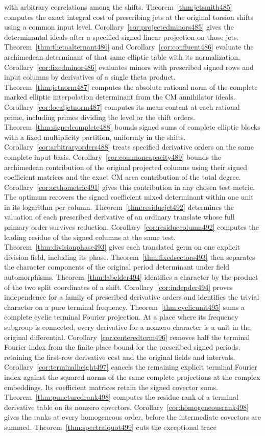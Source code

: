 \documentclass[a4paper,11pt]{article}
\theoremstyle{definition}
\theoremstyle{remark}
\numberwithin{equation}{section}
\begin{document}
with arbitrary correlations among the shifts. Theorem~\ref{thm:jetsmith485} computes the exact integral cost of prescribing jets at the original torsion shifts using a common input level. Corollary~\ref{cor:projectedminors485} gives the determinantal ideals after a specified signed linear projection on those jets. Theorem~\ref{thm:thetaalternant486} and Corollary~\ref{cor:confluent486} evaluate the archimedean determinant of that same elliptic table with its normalization. Corollary~\ref{cor:fixedminor486} evaluates minors with prescribed signed rows and input columns by derivatives of a single theta product. Theorem~\ref{thm:jetnorm487} computes the absolute rational norm of the complete marked elliptic interpolation determinant from the CM annihilator ideals. Corollary~\ref{cor:localjetnorm487} computes its mean content at each rational prime, including primes dividing the level or the shift orders. Theorem~\ref{thm:signedcomplete488} bounds signed sums of complete elliptic blocks with a fixed multiplicity partition, uniformly in the shifts. Corollary~\ref{cor:arbitraryorders488} treats specified derivative orders on the same complete input basis. Corollary~\ref{cor:commoncapacity489} bounds the archimedean contribution of the original projected columns using their signed coefficient matrices and the exact CM area contribution of the total degree. Corollary~\ref{cor:orthometric491} gives this contribution in any chosen test metric. The optimum recovers the signed coefficient mixed determinant within one unit in its logarithm per column. Theorem~\ref{thm:residuejet492} determines the valuation of each prescribed derivative of an ordinary translate whose full primary order survives reduction. Corollary~\ref{cor:residuecolumn492} computes the leading residue of the signed columns at the same test. Theorem~\ref{thm:divisionphase493} gives each translated germ on one explicit division field, including its phase. Theorem~\ref{thm:fixedsectors493} then separates the character components of the original period determinant under field automorphisms. Theorem~\ref{thm:labelder494} identifies a character by the product of the two split coordinates of a shift. Corollary~\ref{cor:indepder494} proves independence for a family of prescribed derivative orders and identifies the trivial character on a pure terminal frequency. Theorem~\ref{thm:cyclicunit495} sums a complete cyclic terminal Fourier projection. At a place where its frequency subgroup is connected, every derivative for a nonzero character is a unit in the original differential. Corollary~\ref{cor:centeredterm496} removes half the terminal Fourier index from the finite-place bound for the prescribed signed periods, retaining the first-row derivative cost and the original fields and intervals. Corollary~\ref{cor:terminalheight497} cancels the remaining explicit terminal Fourier index against the squared norms of the same complete projections at the complex embeddings. Its coefficient matrices retain the signed covector sums. Theorem~\ref{thm:puncturedrank498} computes the residue rank of a terminal derivative table on its nonzero covectors. Corollary~\ref{cor:homogeneousrank498} gives the ranks at every homogeneous order, before the intermediate covectors are summed. Theorem~\ref{thm:spectralquot499} cuts the exceptional trace 
\end{document}
